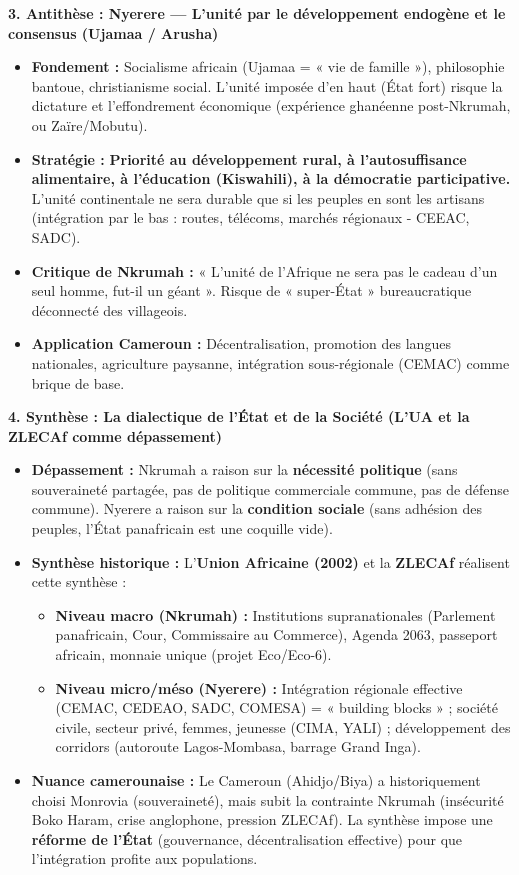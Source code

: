 \documentclass[11pt]{article}
\newcommand{\cle}[1]{{\popxbold\color{popdark}#1}}
\begin{document}
\begin{exoresolu}
\textbf{3. Antithèse : Nyerere — L'unité par le développement endogène et le consensus (Ujamaa / Arusha)}
\begin{itemize}
    \item \textbf{Fondement :} Socialisme africain (\cle{Ujamaa} = « vie de famille »), philosophie bantoue, christianisme social. L'unité imposée d'en haut (État fort) risque la dictature et l'effondrement économique (expérience ghanéenne post-Nkrumah, ou Zaïre/Mobutu).
    \item \textbf{Stratégie :} \textbf{Priorité au développement rural, à l'autosuffisance alimentaire, à l'éducation (Kiswahili), à la démocratie participative.} L'unité continentale ne sera durable que si les peuples en sont les artisans (intégration par le bas : routes, télécoms, marchés régionaux - CEEAC, SADC).
    \item \textbf{Critique de Nkrumah :} « L'unité de l'Afrique ne sera pas le cadeau d'un seul homme, fut-il un géant ». Risque de « super-État » bureaucratique déconnecté des villageois.
    \item \textbf{Application Cameroun :} Décentralisation, promotion des langues nationales, agriculture paysanne, intégration sous-régionale (CEMAC) comme brique de base.
\end{itemize}

\textbf{4. Synthèse : La dialectique de l'État et de la Société (L'UA et la ZLECAf comme dépassement)}
\begin{itemize}
    \item \textbf{Dépassement :} Nkrumah a raison sur la \textbf{nécessité politique} (sans souveraineté partagée, pas de politique commerciale commune, pas de défense commune). Nyerere a raison sur la \textbf{condition sociale} (sans adhésion des peuples, l'État panafricain est une coquille vide).
    \item \textbf{Synthèse historique :} L'\textbf{Union Africaine (2002)} et la \textbf{ZLECAf} réalisent cette synthèse :
        \begin{itemize}
            \item \textbf{Niveau macro (Nkrumah) :} Institutions supranationales (Parlement panafricain, Cour, Commissaire au Commerce), Agenda 2063, passeport africain, monnaie unique (projet Eco/Eco-6).
            \item \textbf{Niveau micro/méso (Nyerere) :} Intégration régionale effective (CEMAC, CEDEAO, SADC, COMESA) = « building blocks » ; société civile, secteur privé, femmes, jeunesse (CIMA, YALI) ; développement des corridors (autoroute Lagos-Mombasa, barrage Grand Inga).
        \end{itemize}
    \item \textbf{Nuance camerounaise :} Le Cameroun (Ahidjo/Biya) a historiquement choisi Monrovia (souveraineté), mais subit la contrainte Nkrumah (insécurité Boko Haram, crise anglophone, pression ZLECAf). La synthèse impose une \textbf{réforme de l'État} (gouvernance, décentralisation effective) pour que l'intégration profite aux populations.
\end{itemize}


\end{exoresolu}
\end{document}
